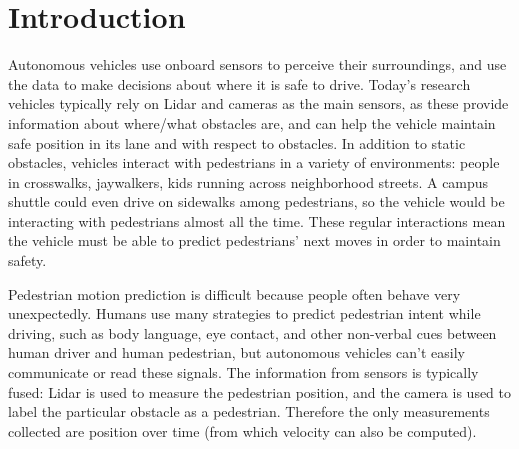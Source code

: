 
\section{Introduction} \label{sec:intro}

Autonomous vehicles use onboard sensors to perceive their surroundings, and use the data to make decisions about where it is safe to drive.
Today's research vehicles typically rely on Lidar and cameras as the main sensors, as these provide information about where/what obstacles are, and can help the vehicle maintain safe position in its lane and with respect to obstacles.
In addition to static obstacles, vehicles interact with pedestrians in a variety of environments: people in crosswalks, jaywalkers, kids running across neighborhood streets.
A campus shuttle could even drive on sidewalks among pedestrians, so the vehicle would be interacting with pedestrians almost all the time.
These regular interactions mean the vehicle must be able to predict pedestrians' next moves in order to maintain safety.

Pedestrian motion prediction is difficult because people often behave very unexpectedly.
Humans use many strategies to predict pedestrian intent while driving, such as body language, eye contact, and other non-verbal cues between human driver and human pedestrian, but autonomous vehicles can't easily communicate or read these signals.
The information from sensors is typically fused: Lidar is used to measure the pedestrian position, and the camera is used to label the particular obstacle as a pedestrian.
Therefore the only measurements collected are position over time (from which velocity can also be computed).

